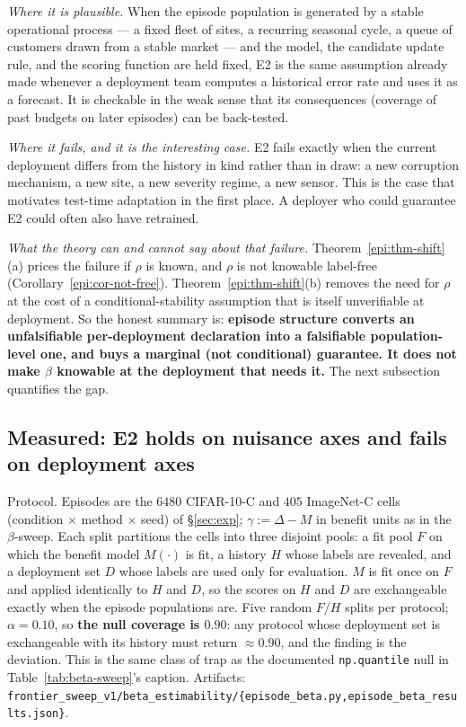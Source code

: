 \emph{Where it is plausible.} When the episode population is generated by a stable operational
process --- a fixed fleet of sites, a recurring seasonal cycle, a queue of customers drawn from a
stable market --- and the model, the candidate update rule, and the scoring function are held fixed,
E2 is the same assumption already made whenever a deployment team computes a historical error rate
and uses it as a forecast. It is checkable in the weak sense that its consequences (coverage of past
budgets on later episodes) can be back-tested.

\emph{Where it fails, and it is the interesting case.} E2 fails exactly when the current deployment
differs from the history in kind rather than in draw: a new corruption mechanism, a new site, a new
severity regime, a new sensor. This is the case that motivates test-time adaptation in the first
place. A deployer who could guarantee E2 could often also have retrained.

\emph{What the theory can and cannot say about that failure.} Theorem~\ref{epi:thm-shift}(a) prices
the failure if $\rho$ is known, and $\rho$ is not knowable label-free
(Corollary~\ref{epi:cor-not-free}). Theorem~\ref{epi:thm-shift}(b) removes the need for $\rho$ at the
cost of a conditional-stability assumption that is itself unverifiable at deployment. So the honest
summary is: \textbf{episode structure converts an unfalsifiable per-deployment declaration into a
falsifiable population-level one, and buys a marginal (not conditional) guarantee. It does not make
$\beta$ knowable at the deployment that needs it.} The next subsection quantifies the gap.

\subsection{Measured: E2 holds on nuisance axes and fails on deployment axes}
\label{sec:episode-empirics}\label{epi:sec-numerics}

Protocol. Episodes are the $6480$ CIFAR-10-C and $405$ ImageNet-C cells (condition $\times$ method
$\times$ seed) of \S\ref{sec:exp}; $\gamma:=\Delta-M$ in benefit units as in the
$\beta$-sweep. Each split partitions the cells into three disjoint pools: a fit pool $F$ on which the
benefit model $M(\cdot)$ is fit, a history $H$ whose labels are revealed, and a deployment set $D$
whose labels are used only for evaluation. $M$ is fit once on $F$ and applied identically to $H$ and
$D$, so the scores on $H$ and $D$ are exchangeable exactly when the episode populations are. Five
random $F/H$ splits per protocol; $\alpha=0.10$, so \textbf{the null coverage is $0.90$}: any
protocol whose deployment set is exchangeable with its history must return $\approx0.90$, and the
finding is the deviation. This is the same class of trap as the documented \texttt{np.quantile} null
in Table~\ref{tab:beta-sweep}'s caption. Artifacts:
\texttt{frontier\_sweep\_v1/beta\_estimability/\{episode\_beta.py,episode\_beta\_results.json\}}.

